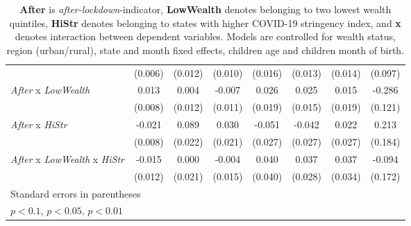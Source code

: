 \begin{table}[htbp]
\begin{tabular}{l*{7}{c}}
                    &     (0.006)         &     (0.012)         &     (0.010)         &     (0.016)         &     (0.013)         &     (0.014)         &     (0.097)         \\
[1em]
\textit{After} x \textit{LowWealth}&       0.013         &       0.004         &      -0.007         &       0.026         &       0.025         &       0.015         &      -0.286\sym{**} \\
                    &     (0.008)         &     (0.012)         &     (0.011)         &     (0.019)         &     (0.015)         &     (0.019)         &     (0.121)         \\
[1em]
\textit{After} x \textit{HiStr}&      -0.021\sym{**} &       0.089\sym{***}&       0.030         &      -0.051\sym{*}  &      -0.042         &       0.022         &       0.213         \\
                    &     (0.008)         &     (0.022)         &     (0.021)         &     (0.027)         &     (0.027)         &     (0.027)         &     (0.184)         \\
[1em]
\textit{After} x \textit{LowWealth} x \textit{HiStr}&      -0.015         &       0.000         &      -0.004         &       0.040         &       0.037         &       0.037         &      -0.094         \\
                    &     (0.012)         &     (0.021)         &     (0.015)         &     (0.040)         &     (0.028)         &     (0.034)         &     (0.172)         \\
\hline\hline \multicolumn{8}{l}{\footnotesize Standard errors in parentheses}\\ \multicolumn{8}{l}{\footnotesize \sym{*} \(p<0.1\), \sym{**} \(p<0.05\), \sym{***} \(p<0.01\)}\\ \end{tabular} \\ \caption*{\textbf{After} is \textit{after-lockdown}-indicator, \textbf{LowWealth} denotes belonging to two lowest wealth quintiles, \textbf{HiStr} denotes belonging to states with higher COVID-19 stringency index, and \textbf{x} denotes interaction between dependent variables. Models are controlled for wealth status, region (urban/rural), state and month fixed effects, children age and children month of birth.} \end{table}
